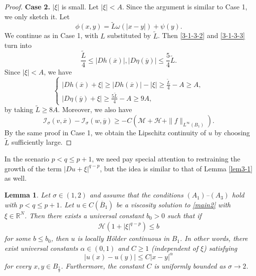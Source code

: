 \documentclass[11pt,reqno]{amsart}
\numberwithin{equation}{section}
\newtheorem{lemma}[theorem]{Lemma}
\begin{document}
\begin{proof}
\textbf{Case 2.} $|\xi|$ is small. Let $|\xi|<A$. Since the argument is similar to Case 1, we only sketch it. Let
$$
\phi(x,y)=\tilde{L}\omega(|x-y|)+\psi(y).
$$
We continue as in Case 1, with $L$ substituted by $\tilde{L}$. Then \eqref{3-1-3-2} and \eqref{3-1-3-3} turn into
$$
\frac{\tilde{L}}{4}\le |Dh(\overline{x})|,|D\eta(\overline{y})|\le \frac{5}{4}\tilde{L}.
$$
Since $|\xi|<A$, we have
\begin{equation*}
\begin{cases}
|Dh(\overline{x})+\xi|\ge|Dh(\overline{x})|-|\xi|\ge\frac{\tilde{L}}{4}-A\ge A,\\
|D\eta(\overline{y})+\xi|\ge\frac{5\tilde{L}}{4}-A\ge 9A,
\end{cases}
\end{equation*}
by taking $\tilde{L}\ge8A$. Moreover, we also have
$$
\mathcal{I}_\sigma(v,\overline{x})-\mathcal{I}_\sigma(w,\overline{y})\ge-C(\mathcal{M}+\mathcal{H}+\|f\|_{L^\infty(B_1)}).
$$
By the same proof in Case 1, we obtain the Lipschitz continuity of $u$ by choosing $\tilde{L}$ sufficiently large.
\end{proof}

In the scenario $p<q\le p+1$, we need pay special attention to restraining the growth of the term $|Du+\xi|^{q-p}$, but the idea is similar to that of Lemma \ref{lem3-1} as well.

\begin{lemma}
\label{lem3-2}
Let $\sigma\in(1,2)$ and assume that the conditions $(A_1)$--$(A_3)$ hold with $p< q\le p+1$. Let $u\in C(\overline{B}_1)$ be a viscosity solution to \eqref{main2} with $\xi\in\mathbb{R}^N$.
Then there exists a universal constant $b_0>0$ such that if
\begin{align}
\label{3-2-1}
\mathcal{H}(1+|\xi|^{q-p})\le b
\end{align}
for some $b\le b_0$, then $u$ is locally H\"{o}lder continuous in $B_1$.
In other words, there exist universal constants $\alpha\in(0,1)$ and $C\ge1$ (independent of $\xi$) satisfying
$$
|u(x)-u(y)|\le C|x-y|^\alpha
$$
for every $x,y\in B_{\frac12}$. Furthermore, the constant $C$ is uniformly bounded as $\sigma\rightarrow2$.
\end{lemma}
\end{document}
